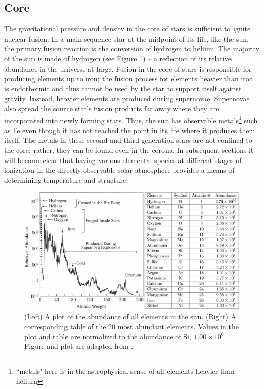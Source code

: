 \subsection{Core}
The gravitational pressure and density in the core of stars is sufficient to ignite nuclear fusion. In a main sequence star at the midpoint of its life, like the sun, the primary fusion reaction is the conversion of hydrogen to helium. The majority of the sun is made of hydrogen (see Figure \ref{fig:sunabundance}) -- a reflection of its relative abundance in the universe at large. Fusion in the core of stars is responsible for producing elements up to iron; the fusion process for elements heavier than iron is endothermic and thus cannot be used by the star to support itself against gravity. Instead, heavier elements are produced during supernovae. Supernovae also spread the source star's fusion products far away where they are incorporated into newly forming stars. Thus, the sun has observable metals\footnote{``metals" here is in the astrophysical sense of all elements heavier than helium} such as Fe even though it has not reached the point in its life where it produces them itself. The metals in these second and third generation stars are not confined to the core; rather, they can be found even in the corona. In subsequent sections it will become clear that having various elemental species at different stages of ionization in the directly observable solar atmosphere provides a means of determining temperature and structure. 

\begin{figure}[!h]
    \begin{center}
	    \includegraphics[width=\textwidth]{Images/SolarAbundance.png}
    \end{center}
    \caption[Solar Elemental Abundances]{
        (Left) A plot of the abundance of all elements in the sun. (Right) A corresponding table of the 20 most 
        abundant elements. Values in the plot and table are normalized to the abundance of Si, $1.00 \times 10^6$. 
        Figure and plot are adapted from \citet{Lang2001}.       
    }
    \label{fig:sunabundance}
\end{figure}

